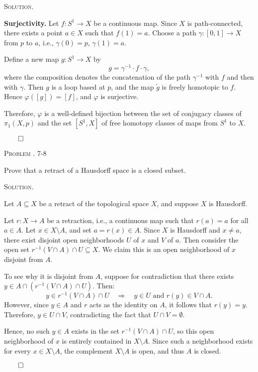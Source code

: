 \documentclass[12pt, a4paper, oneside]{ctexart}
\newcounter{problemname}
\newenvironment{problem}{\begin{framed}\stepcounter{problemname}\par\noindent\textsc{Problem \arabic{problemname}. }}{\end{framed}\par}
\newenvironment{solution}{%
	\par\noindent\textsc{Solution. }\ignorespaces
}{%
	\hfill$\qed$\par
}
\begin{document}
\begin{solution}
		\textbf{Surjectivity.} Let \( f: S^1 \to X \) be a continuous map. Since \( X \) is path-connected, there exists a point \( a \in X \) such that \( f(1) = a \). Choose a path \( \gamma: [0,1] \to X \) from \( p \) to \( a \), i.e., \( \gamma(0) = p \), \( \gamma(1) = a \).
		
		Define a new map \( g: S^1 \to X \) by
		\[
		g = \gamma^{-1} \cdot f \cdot \gamma,
		\]
		where the composition denotes the concatenation of the path \( \gamma^{-1} \) with \( f \) and then with \( \gamma \). Then \( g \) is a loop based at \( p \), and the map \( \tilde{g} \) is freely homotopic to \( f \). Hence \( \varphi([g]) = [f] \), and \( \varphi \) is surjective.
		
		\medskip
		
		Therefore, \( \varphi \) is a well-defined bijection between the set of conjugacy classes of \( \pi_1(X, p) \) and the set \( [S^1, X] \) of free homotopy classes of maps from \( S^1 \) to \( X \).
		
		
	\end{solution}
	
	\begin{problem}
	7-8
	
	Prove that a retract of a Hausdorff space is a closed subset.
		
	\end{problem}
	
	\begin{solution}
		
		Let \( A \subseteq X \) be a retract of the topological space \( X \), and suppose \( X \) is Hausdorff. 
		
		Let \( r: X \to A \) be a retraction, i.e., a continuous map such that \( r(a) = a \) for all \( a \in A \). Let \( x \in X \setminus A \), and set \( a = r(x) \in A \). Since \( X \) is Hausdorff and \( x \neq a \), there exist disjoint open neighborhoods \( U \) of \( x \) and \( V \) of \( a \). Then consider the open set \( r^{-1}(V \cap A) \cap U \subseteq X \). We claim this is an open neighborhood of \( x \) disjoint from \( A \).
		
		To see why it is disjoint from \( A \), suppose for contradiction that there exists \( y \in A \cap \left( r^{-1}(V \cap A) \cap U \right) \). Then:
		\[
		y \in r^{-1}(V \cap A) \cap U \quad \Rightarrow \quad y \in U \text{ and } r(y) \in V \cap A.
		\]
		However, since \( y \in A \) and \( r \) acts as the identity on \( A \), it follows that \( r(y) = y \). Therefore, \( y \in U \cap V \), contradicting the fact that \( U \cap V = \emptyset \).
		
		Hence, no such \( y \in A \) exists in the set \( r^{-1}(V \cap A) \cap U \), so this open neighborhood of \( x \) is entirely contained in \( X \setminus A \). Since such a neighborhood exists for every \( x \in X \setminus A \), the complement \( X \setminus A \) is open, and thus \( A \) is closed.
		
		
	\end{solution}
	
\end{document}
